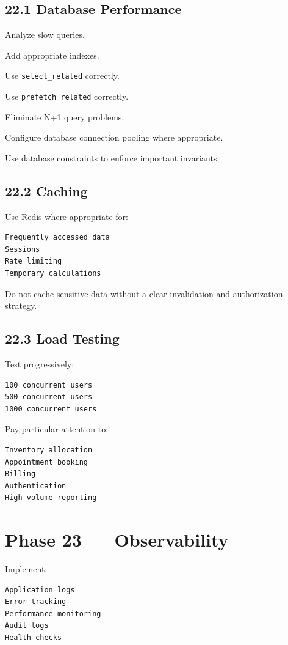 \documentclass[11pt,a4paper]{article}
\newcommand{\task}[1]{\item[$\square$] #1}
\begin{document}
\subsection{22.1 Database Performance}

\task{Analyze slow queries.}
\task{Add appropriate indexes.}
\task{Use \texttt{select\_related} correctly.}
\task{Use \texttt{prefetch\_related} correctly.}
\task{Eliminate N+1 query problems.}
\task{Configure database connection pooling where appropriate.}
\task{Use database constraints to enforce important invariants.}

\subsection{22.2 Caching}

Use Redis where appropriate for:

\begin{lstlisting}
Frequently accessed data
Sessions
Rate limiting
Temporary calculations
\end{lstlisting}

Do not cache sensitive data without a clear invalidation and authorization
strategy.

\subsection{22.3 Load Testing}

Test progressively:

\begin{lstlisting}
100 concurrent users
500 concurrent users
1000 concurrent users
\end{lstlisting}

Pay particular attention to:

\begin{lstlisting}
Inventory allocation
Appointment booking
Billing
Authentication
High-volume reporting
\end{lstlisting}

\section{Phase 23 --- Observability}

Implement:

\begin{lstlisting}
Application logs
Error tracking
Performance monitoring
Audit logs
Health checks
\end{lstlisting}
\end{document}
